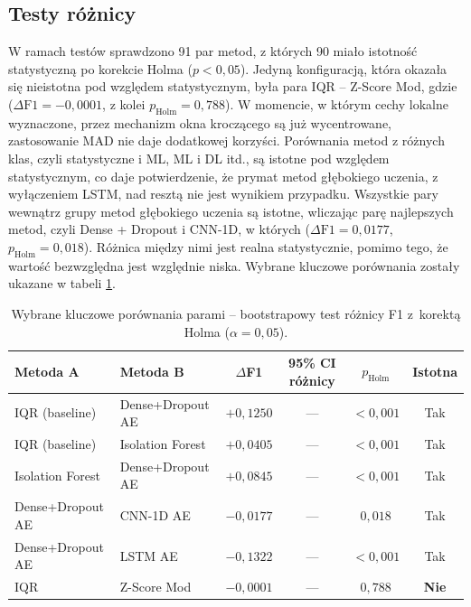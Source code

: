\documentclass[a4paper,twoside,12pt]{book}
\begin{document}
	\subsection{Testy różnicy}
	
	W ramach testów sprawdzono 91 par metod, z których 90 miało istotność statystyczną po korekcie Holma ($p < 0{,}05$). Jedyną konfiguracją, która okazała się nieistotna pod względem statystycznym, była para IQR – Z-Score Mod, gdzie ($\Delta\text{F1} = -0{,}0001$, z kolei $p_\text{Holm} = 0{,}788$). W momencie, w którym cechy lokalne wyznaczone, przez mechanizm okna kroczącego są już wycentrowane, zastosowanie MAD nie daje dodatkowej korzyści. Porównania metod z różnych klas, czyli statystyczne i ML, ML i DL itd., są istotne pod względem statystycznym, co daje potwierdzenie, że prymat metod głębokiego uczenia, z wyłączeniem LSTM, nad resztą nie jest wynikiem przypadku. Wszystkie pary wewnątrz grupy metod głębokiego uczenia są istotne, wliczając parę najlepszych metod, czyli Dense + Dropout i CNN-1D, w których ($\Delta\text{F1} = 0{,}0177$, $p_\text{Holm} = 0{,}018$). Różnica między nimi jest realna statystycznie, pomimo tego, że wartość bezwzględna jest względnie niska. Wybrane kluczowe porównania zostały ukazane w tabeli \ref{tab:pary_kluczowe}. 
	
	\begin{table}%
		\centering
		\caption{Wybrane kluczowe porównania parami -- bootstrapowy
			test różnicy F1 z~korektą Holma ($\alpha=0{,}05$).}
		\label{tab:pary_kluczowe}
		\small
		\begin{tabular}{llcccc}
			\toprule
			\textbf{Metoda A} & \textbf{Metoda B}
			& $\Delta$\textbf{F1}
			& \textbf{95\% CI różnicy}
			& $p_\text{Holm}$
			& \textbf{Istotna} \\
			\midrule
			IQR (baseline)   & Dense+Dropout AE & $+0{,}1250$ & --- & $<0{,}001$ & Tak \\
			IQR (baseline)   & Isolation Forest & $+0{,}0405$ & --- & $<0{,}001$ & Tak \\
			Isolation Forest & Dense+Dropout AE & $+0{,}0845$ & --- & $<0{,}001$ & Tak \\
			Dense+Dropout AE & CNN-1D AE        & $-0{,}0177$ & --- & $0{,}018$  & Tak \\
			Dense+Dropout AE & LSTM AE          & $-0{,}1322$ & --- & $<0{,}001$ & Tak \\
			IQR              & Z-Score Mod      & $-0{,}0001$ & --- & $0{,}788$  & \textbf{Nie} \\
			\bottomrule
		\end{tabular}
	\end{table}
	
\end{document}
